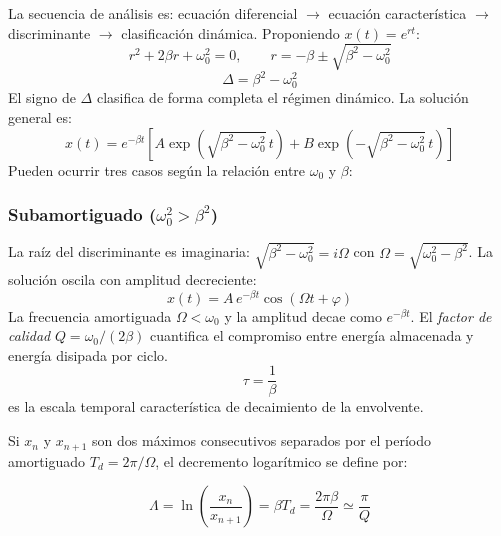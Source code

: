 \documentclass[12pt, a4paper]{article}
\theoremstyle{plain}
\theoremstyle{definition}
\theoremstyle{remark}
\begin{document}
La secuencia de análisis es: ecuación diferencial $\to$ ecuación característica
$\to$ discriminante $\to$ clasificación dinámica. Proponiendo $x(t)=e^{rt}$:
\begin{equation}
  r^2 + 2\beta r + \omega_0^2 = 0,\qquad
  r = -\beta \pm \sqrt{\beta^2 - \omega_0^2}
\end{equation}
\begin{equation}
  \Delta = \beta^2-\omega_0^2
\end{equation}
El signo de $\Delta$ clasifica de forma completa el régimen dinámico.
La solución general es:
\begin{equation}
  x(t) = e^{-\beta t}\!\left[A\exp\!\left(\sqrt{\beta^2-\omega_0^2}\,t\right)
         + B\exp\!\left(-\sqrt{\beta^2-\omega_0^2}\,t\right)\right]
\end{equation}
Pueden ocurrir tres casos según la relación entre $\omega_0$ y $\beta$:

\subsubsection{Subamortiguado \texorpdfstring{($\omega_0^2 > \beta^2$)}{}}

La raíz del discriminante es imaginaria: $\sqrt{\beta^2-\omega_0^2}=i\Omega$ con
$\Omega=\sqrt{\omega_0^2-\beta^2}$. La solución oscila con amplitud decreciente:
\begin{equation}
  x(t) = A\,e^{-\beta t}\cos(\Omega t + \varphi)
\end{equation}
La frecuencia amortiguada $\Omega < \omega_0$ y la amplitud decae como $e^{-\beta t}$.
El \emph{factor de calidad} $Q = \omega_0/(2\beta)$ cuantifica el compromiso entre
energía almacenada y energía disipada por ciclo.
\begin{equation}
  \tau=\frac{1}{\beta}
\end{equation}
es la escala temporal característica de decaimiento de la envolvente.

Si $x_n$ y $x_{n+1}$ son dos máximos consecutivos separados por el período amortiguado
$T_d=2\pi/\Omega$, el decremento logarítmico se define por:
\begin{mdframed}[style=resultado]
\begin{equation}
  \Lambda=\ln\!\left(\frac{x_n}{x_{n+1}}\right)=\beta T_d
  =\frac{2\pi\beta}{\Omega}\simeq\frac{\pi}{Q}
\end{equation}
\end{mdframed}
\end{document}
